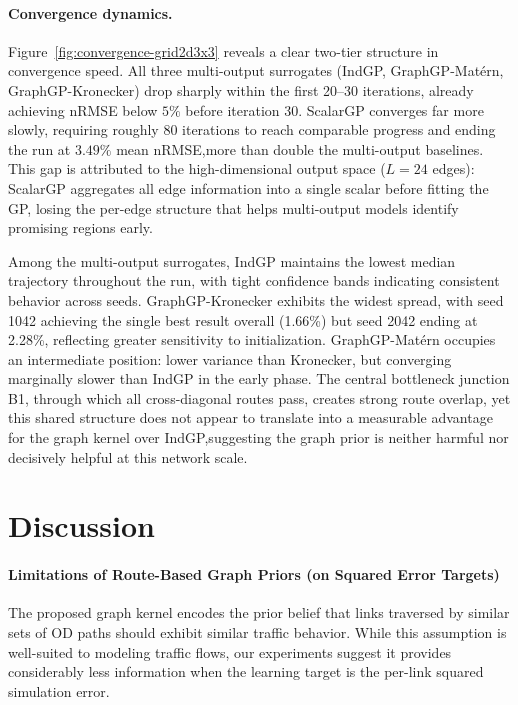 \documentclass[11pt]{article}
\begin{document}
\paragraph{Convergence dynamics.}
Figure~\ref{fig:convergence-grid2d3x3} reveals a clear two-tier structure in
convergence speed.  All three multi-output surrogates (IndGP, GraphGP-Mat\'ern,
GraphGP-Kronecker) drop sharply within the first 20--30 iterations, already
achieving nRMSE below $5\%$ before iteration 30.  ScalarGP converges far more
slowly, requiring roughly 80 iterations to reach comparable progress and ending
the run at $3.49\%$ mean nRMSE,more than double the multi-output baselines.
This gap is attributed to the high-dimensional output space ($L=24$ edges):
ScalarGP aggregates all edge information into a single scalar before fitting the
GP, losing the per-edge structure that helps multi-output models identify
promising regions early.

Among the multi-output surrogates, IndGP maintains the lowest median trajectory
throughout the run, with tight confidence bands indicating consistent behavior
across seeds.  GraphGP-Kronecker exhibits the widest spread, with seed 1042
achieving the single best result overall (1.66\%) but seed 2042 ending at 2.28\%,
reflecting greater sensitivity to initialization.  GraphGP-Mat\'ern occupies an
intermediate position: lower variance than Kronecker, but converging marginally
slower than IndGP in the early phase.  The central bottleneck junction B1,
through which all cross-diagonal routes pass, creates strong route overlap, yet
this shared structure does not appear to translate into a measurable advantage
for the graph kernel over IndGP,suggesting the graph prior is neither harmful
nor decisively helpful at this network scale.

\newpage

\section{Discussion}
\label{sec:discussion}

\paragraph{Limitations of Route-Based Graph Priors (on Squared Error Targets)}
\label{sec:discussion_graph}

The proposed graph kernel encodes the prior belief that links traversed by similar sets of OD paths should exhibit similar traffic behavior. While this assumption is well-suited to modeling traffic flows, our experiments suggest it provides considerably less information when the learning target is the per-link squared simulation error.
\end{document}
